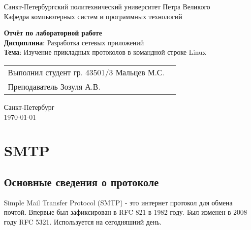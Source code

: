 \documentclass[a4paper,14pt]{extarticle}
\begin{document}
\begin{titlepage}
\centering
Санкт-Петербургский политехнический университет Петра Великого \\
\vspace{0.15cm}
Кафедра компьютерных систем и программных технологий \\
\vspace{6.5cm}

{\centering \textbf{Отчёт по лабораторной работе} \\ 
\vspace{0.15cm}
\textbf{Дисциплина}: Разработка сетевых приложений \\
\vspace{0.15cm}
\textbf{Тема}: Изучение прикладных протоколов в командной строке Linux} \\

\vspace{6.5cm}

\begin{table}[H]
\begin{tabular}{p{\textwidth}@{}r}
{Выполнил студент гр. 43501/3} \hfill {Мальцев  М.С.} \\
{Преподаватель} \hfill {Зозуля А.В.} \\
\end{tabular}
\end{table}
\vfill

{\centering Санкт-Петербург \\ 
\vspace{0.15cm}
\today}
\end{titlepage}

\section{SMTP}

\subsection{Основные сведения о протоколе}
Simple Mail Transfer Protocol (SMTP)  - это интернет протокол для обмена почтой. Впервые был зафиксирован в RFC 821 в 1982 году. Был изменен в 2008 году RFC 5321. Используется на сегодняшний день.
\end{document}
